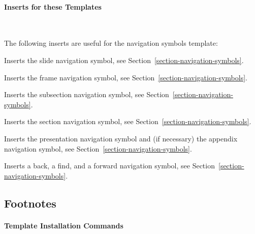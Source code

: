\paragraph{Inserts for these Templates}\ 

The following inserts are useful for the navigation symbols template:

\begin{command}{\insertslidenavigationsymbol}
  Inserts the slide navigation symbol, see
  Section~\ref{section-navigation-symbols}.
\end{command}

\begin{command}{\insertframenavigationsymbol}
  Inserts the frame navigation symbol, see
  Section~\ref{section-navigation-symbols}.
\end{command}

\begin{command}{\insertsubsectionnavigationsymbol}
  Inserts the subsection navigation symbol, see
  Section~\ref{section-navigation-symbols}.
\end{command}

\begin{command}{\insertsectionnavigationsymbol}
  Inserts the section navigation symbol, see
  Section~\ref{section-navigation-symbols}.
\end{command}

\begin{command}{\insertdocnavigationsymbol}
  Inserts the presentation navigation symbol and (if necessary) the
  appendix navigation symbol, see
  Section~\ref{section-navigation-symbols}.
\end{command}

\begin{command}{\insertbackfindforwardnavigationsymbol}
  Inserts a back, a find, and a forward navigation symbol, see
  Section~\ref{section-navigation-symbols}.
\end{command}





\subsection{Footnotes}

\label{section-templates-footnotes}

\paragraph{Template Installation Commands}\

